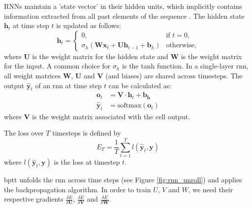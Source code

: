 \documentclass[12pt, a4paper, headinclude, twoside, plainheadsepline, open=right, numbers=noenddot, hidelinks, toc=listof, toc=bibliography]{scrreprt}
\begin{document}
RNNs maintain a 'state vector' in their hidden units, which implicitly contains information extracted from all past elements of the sequence \cite{lecunDeepLearning2015}.
The hidden state $\mathbf{h}_t$ at time step $t$ is updated as follows:
\begin{equation}
\label{eq:rnn_update} 
\mathbf{h}_t =
\begin{cases}
	0, & \text{if } t = 0, \\
	\sigma_h (\mathbf{W} \mathbf{x}_t + \mathbf{U} \mathbf{h}_{t-1} + \mathbf{b}_h)
	& \text{otherwise},
\end{cases}
\end{equation}
where $\mathbf{U}$ is the weight matrix for the hidden state and $\mathbf{W}$ is the weight matrix for the input.
A common choice for $\sigma_h$ is the tanh function.
In a single-layer \ac{rnn}, all weight matrices $\mathbf{W}$, $\mathbf{U}$ and $\mathbf{V}$ (and biases) are shared across timesteps.
The output $\mathbf{\hat{y}}_t$ of an \ac{rnn} at time step $t$ can be calculated as:
\begin{equation}
\label{eq:rnn_output}
\begin{split}
\mathbf{o}_t &= \mathbf{V} \cdot \mathbf{h}_t + \mathbf{b_h} \\
\mathbf{\hat{y}}_t &= \text{softmax}(\mathbf{o}_t)
\end{split}
\end{equation}
where $\mathbf{V}$ is the weight matrix associated with the cell output. 

The loss over $T$ timesteps is defined by 
\begin{equation}
E_T = \frac{1}{T} \sum_{t=1}^{T} {l(\mathbf{\hat{y}}_t, \mathbf{y})}
\end{equation} 
where $l(\mathbf{\hat{y}}_t, \mathbf{y})$ is the loss at timestep $t$.

\Ac{bptt} unfolds the \ac{rnn} across time steps (see Figure \ref{fig:rnn_unroll}) and applies the backpropagation algorithm. 
In order to train $U$, $V$ and $W$, we need their respective gradients $\frac{\delta E}{\delta \mathbf{U}}$, $\frac{\delta E}{\delta \mathbf{V}}$ and $\frac{\delta E}{\delta \mathbf{W}}$.
\end{document}

